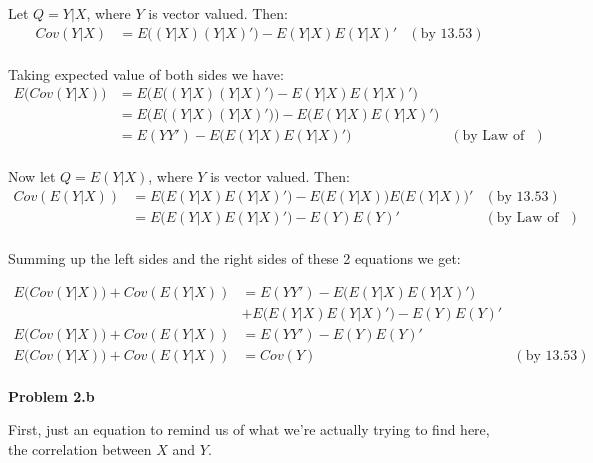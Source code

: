\documentclass[12pt]{article}
\begin{document}
Let $Q=Y|X$, where $Y$ is vector valued. 
Then:
\begin{equation*}
	\begin{aligned}
	Cov(Y|X) &= E\big((Y|X)(Y|X)'\big) - E(Y|X)E(Y|X)' &(\textrm{by 13.53})\\
	\end{aligned}
\end{equation*}

Taking expected value of both sides we have:
\begin{equation*}
	\begin{aligned}
	E\big(Cov(Y|X)\big) &= E\Big(E\big((Y|X)(Y|X)'\big) - E(Y|X)E(Y|X)'\Big)\\
	              &= E\Big(E\big((Y|X)(Y|X)'\big)\Big) - E\Big(E(Y|X)E(Y|X)'\Big)\\
	              &= E(YY') - E\Big(E(Y|X)E(Y|X)'\Big) &(\textrm{by Law of Tot. Expect.})\\
	\end{aligned}
\end{equation*}

Now let $Q=E(Y|X)$, where $Y$ is vector valued. 
Then:
\begin{equation*}
	\begin{aligned}
	Cov(E(Y|X)) &= E\big(E(Y|X)E(Y|X)'\big) - E\big(E(Y|X)\big)E\big(E(Y|X)\big)' &(\textrm{by 13.53})\\
	              &= E\big(E(Y|X)E(Y|X)'\big) - E(Y)E(Y)' &(\textrm{by Law of Tot. Expect.})\\
	\end{aligned}
\end{equation*}

Summing up the left sides and the right sides of these 2 equations we get:

\begin{equation*}
	\begin{aligned}
	E\big(Cov(Y|X)\big) + Cov(E(Y|X)) &= E(YY') - E\Big(E(Y|X)E(Y|X)'\Big) \\&+ E\big(E(Y|X)E(Y|X)'\big) - E(Y)E(Y)'\\
	E\big(Cov(Y|X)\big) + Cov(E(Y|X)) &= E(YY') - E(Y)E(Y)' \\
	E\big(Cov(Y|X)\big) + Cov(E(Y|X)) &= Cov(Y) &(\textrm{by 13.53})\\
	\end{aligned}
\end{equation*}


\textbf{Problem 2.b} 

First, just an equation to remind us of what we're actually trying to find here, the correlation between $X$ and $Y$.
\end{document}
